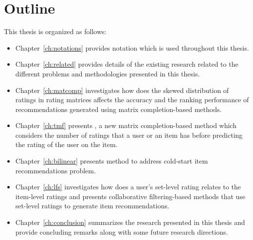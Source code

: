 

\section{Outline}
\label{ch:intro:outline}
This thesis is organized as follows:

\begin{itemize}

\item Chapter~\ref{ch:notations} provides notation which is used
throughout this thesis.

\item Chapter~\ref{ch:related} provides details of the existing research related to the different problems and methodologies presented in this thesis.

\item Chapter~\ref{ch:matcomp} investigates how does the skewed distribution of ratings in rating matrices affects the accuracy and the ranking performance of recommendations generated using matrix completion-based methods.


\item Chapter~\ref{ch:tmf} presents \TMF,  a new matrix completion-based method which considers the number of ratings that a user or an item has before predicting the rating of the user on the item.


\item Chapter~\ref{ch:bilinear} presents \CFEXPB method to address \TOPN cold-start item recommendations problem.


\item Chapter~\ref{ch:lfs} investigates how does a user's set-level rating relates to the item-level ratings and presents collaborative filtering-based methods that use set-level ratings to generate item recommendations.



\item Chapter~\ref{ch:conclusion} summarizes the research presented in this thesis and provide concluding remarks along with some future research directions.

\end{itemize}


